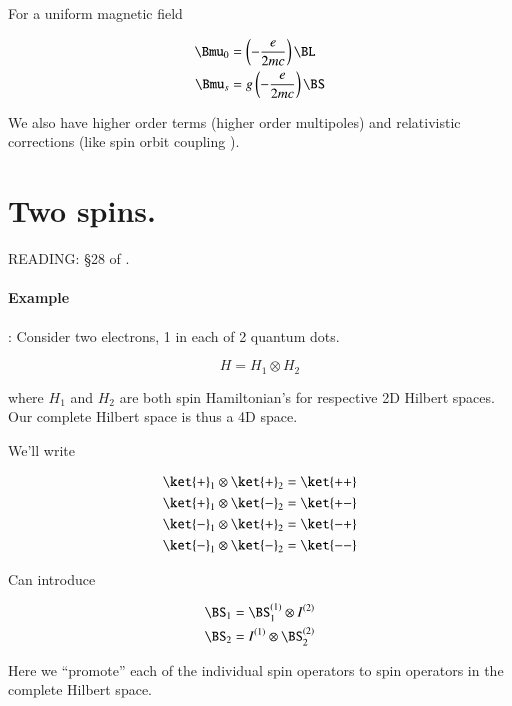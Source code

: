 For a uniform magnetic field

\begin{align}\label{eqn:qmTwoL16:170}
\Bmu_0 &= \left( -\frac{e}{2 m c} \right) \BL \\
\Bmu_s &= g \left( -\frac{e}{2 m c} \right) \BS
\end{align}

We also have higher order terms (higher order multipoles) and relativistic corrections (like spin orbit coupling \cite{wiki:spinorbit}).

\section{Two spins.}

READING: \S 28 of \cite{desai2009quantum}.

\paragraph{Example}: Consider two electrons, 1 in each of 2 quantum dots.

\begin{equation}\label{eqn:qmTwoL16:190}
H = H_{1} \otimes H_{2}
\end{equation}

where $H_1$ and $H_2$ are both spin Hamiltonian's for respective 2D Hilbert spaces.  Our complete Hilbert space is thus a 4D space.

We'll write

\begin{equation}\label{eqn:qmTwoL16:210}
\begin{aligned}
\ket{+}_1 \otimes \ket{+}_2 &= \ket{++} \\
\ket{+}_1 \otimes \ket{-}_2 &= \ket{+-} \\
\ket{-}_1 \otimes \ket{+}_2 &= \ket{-+} \\
\ket{-}_1 \otimes \ket{-}_2 &= \ket{--} 
\end{aligned}
\end{equation}

Can introduce

\begin{align}\label{eqn:qmTwoL16:230}
\BS_1 &= \BS_1^{(1)} \otimes I^{(2)} \\
\BS_2 &= I^{(1)} \otimes \BS_2^{(2)}
\end{align}

Here we ``promote'' each of the individual spin operators to spin operators in the complete Hilbert space.


